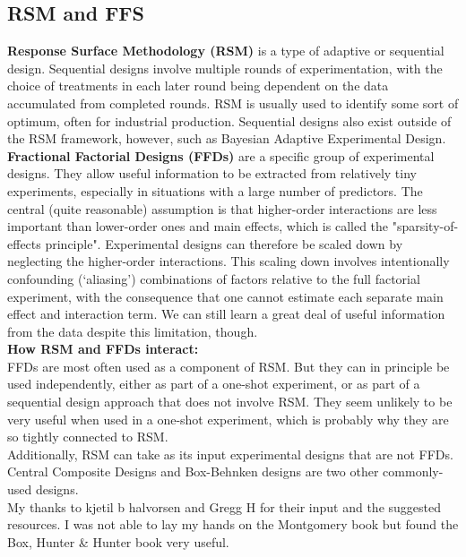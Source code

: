 \documentclass{article}
\begin{document}
\subsection{RSM and FFS}
\textbf{Response Surface Methodology (RSM)} is a type of adaptive or sequential design. Sequential designs involve multiple rounds of experimentation, with the choice of treatments in each later round being dependent on the data accumulated from completed rounds. RSM is usually used to identify some sort of optimum, often for industrial production. Sequential designs also exist outside of the RSM framework, however, such as Bayesian Adaptive Experimental Design.\\[8pt]
\textbf{Fractional Factorial Designs (FFDs)} are a specific group of experimental designs. They allow useful information to be extracted from relatively tiny experiments, especially in situations with a large number of predictors. The central (quite reasonable) assumption is that higher-order interactions are less important than lower-order ones and main effects, which is called the "sparsity-of-effects principle". Experimental designs can therefore be scaled down by neglecting the higher-order interactions. This scaling down involves intentionally confounding (‘aliasing’) combinations of factors relative to the full factorial experiment, with the consequence that one cannot estimate each separate main effect and interaction term. We can still learn a great deal of useful information from the data despite this limitation, though.\\[8pt]
\textbf{How RSM and FFDs interact:}\\[8pt]
FFDs are most often used as a component of RSM. But they can in principle be used independently, either as part of a one-shot experiment, or as part of a sequential design approach that does not involve RSM. They seem unlikely to be very useful when used in a one-shot experiment, which is probably why they are so tightly connected to RSM.\\[8pt]
Additionally, RSM can take as its input experimental designs that are not FFDs. Central Composite Designs and Box-Behnken designs are two other commonly-used designs.\\[8pt]
My thanks to kjetil b halvorsen and Gregg H for their input and the suggested resources. I was not able to lay my hands on the Montgomery book but found the Box, Hunter \& Hunter book very useful.
\end{document}
